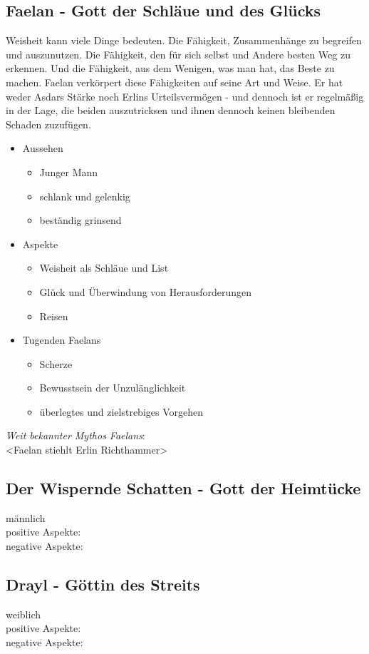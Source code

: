 \subsection{\textbf{Faelan} - Gott der Schläue und des Glücks}
Weisheit kann viele Dinge bedeuten. Die Fähigkeit, Zusammenhänge zu begreifen und auszunutzen. Die Fähigkeit, den für sich selbst und Andere besten Weg zu erkennen. Und die 
Fähigkeit, aus dem Wenigen, was man hat, das Beste zu machen. Faelan verkörpert diese Fähigkeiten auf seine Art und Weise. Er hat weder Asdars Stärke noch Erlins Urteilsvermögen - 
und dennoch ist er regelmäßig in der Lage, die beiden auszutricksen und ihnen dennoch keinen bleibenden Schaden zuzufügen.\\
\begin{itemize}
	\item Aussehen 
	\begin{itemize}
		\item Junger Mann 
		\item schlank und gelenkig
		\item beständig grinsend
	\end{itemize}
	\item Aspekte
	\begin{itemize}
		\item Weisheit als Schläue und List
		\item Glück und Überwindung von Herausforderungen
		\item Reisen 
	\end{itemize}
	\item Tugenden Faelans
	\begin{itemize}
		\item Scherze 
		\item Bewusstsein der Unzulänglichkeit
		\item überlegtes und zielstrebiges Vorgehen
	\end{itemize}
\end{itemize}
\textit{Weit bekannter Mythos Faelans}:\\
<Faelan stiehlt Erlin Richthammer>  


\subsection{\textbf{Der Wispernde Schatten} - Gott der Heimtücke}
männlich\\
positive Aspekte: \\
negative Aspekte: 
\subsection{\textbf{Drayl} - Göttin des Streits}
weiblich\\
positive Aspekte: \\
negative Aspekte: 

